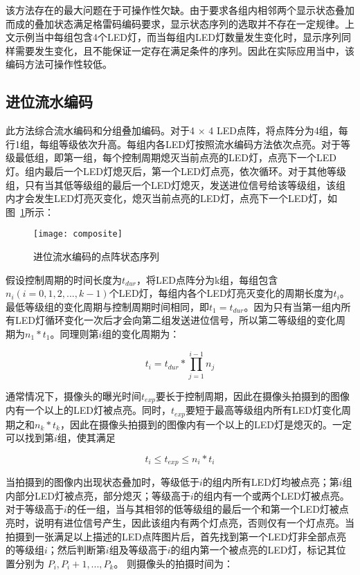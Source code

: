 该方法存在的最大问题在于可操作性欠缺。由于要求各组内相邻两个显示状态叠加而成的叠加状态满足格雷码编码要求，显示状态序列的选取并不存在一定规律。上文示例当中每组包含4个LED灯，而当每组内LED灯数量发生变化时，显示序列同样需要发生变化，且不能保证一定存在满足条件的序列。因此在实际应用当中，该编码方法可操作性较低。

\subsection{进位流水编码}
\label{flowSe}

此方法综合流水编码和分组叠加编码。对于4 × 4 LED点阵，将点阵分为4组，每行1组，每组等级依次升高。每组内各LED灯按照流水编码方法依次点亮。对于等级最低组，即第一组，每个控制周期熄灭当前点亮的LED灯，点亮下一个LED灯。组内最后一个LED灯熄灭后，第一个LED灯点亮，依次循环。对于其他等级组，只有当其低等级组的最后一个LED灯熄灭，发送进位信号给该等级组，该组内才会发生LED灯亮灭变化，熄灭当前点亮的LED灯，点亮下一个LED灯，如图~\ref{composite}所示：

\begin{figure}[h] 
  \centering
  \texttt{[image: composite]}
  \caption{进位流水编码的点阵状态序列}
  \label{composite}
\end{figure}

假设控制周期的时间长度为$t_{dur}$，将LED点阵分为k组，每组包含$n_i(i = 0, 1, 2, ..., k-1)$个LED灯，每组内各个LED灯亮灭变化的周期长度为$t_i$。最低等级组的变化周期与控制周期时间相同，即$t_1 = t_{dur}$。因为只有当第一组内所有LED灯循环变化一次后才会向第二组发送进位信号，所以第二等级组的变化周期为$n_1 * t_1$。同理则第$i$组的变化周期为：

\begin{equation}
t_i = t_{dur} * \prod_{j=1}^{i-1} n_j
  \label{4}
\end{equation}

通常情况下，摄像头的曝光时间$t_{exp}$要长于控制周期，因此在摄像头拍摄到的图像内有一个以上的LED灯被点亮。同时，$t_{exp}$要短于最高等级组内所有LED灯变化周期之和$n_k * t_k$，因此在摄像头拍摄到的图像内有一个以上的LED灯是熄灭的。一定可以找到第$i$组，使其满足

\begin{equation}
t_i \le t_{exp} \le n_i * t_i
  \label{5}
\end{equation}

当拍摄到的图像内出现状态叠加时，等级低于$i$的组内所有LED灯均被点亮；第$i$组内部分LED灯被点亮，部分熄灭；等级高于$i$的组内有一个或两个LED灯被点亮。对于等级高于$i$的任一组，当与其相邻的低等级组的最后一个和第一个LED灯被点亮时，说明有进位信号产生，因此该组内有两个灯点亮，否则仅有一个灯点亮。当拍摄到一张满足以上描述的LED点阵图片后，首先找到第一个LED灯非全部点亮的等级组$i$；然后判断第$i$组及等级高于$i$的组内第一个被点亮的LED灯，标记其位置分别为 $P_i, P_i + 1, ..., P_k$。 则摄像头的拍摄时间为：

